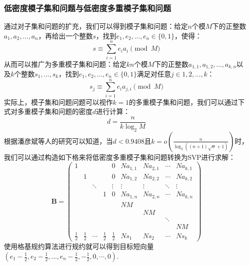 \documentclass{book}
\numberwithin{equation}{subsubsection}
\begin{document}
\subsubsection{低密度模子集和问题与低密度多重模子集和问题}
通过对子集和问题的扩充，我们可以得到模子集和问题：给定$n$个模$M$下的正整数$a_1,a_2,\ldots,a_n$，再给出一个整数$s$，找到$e_1,e_2,\ldots,e_n\in\{0,1\}$，使得：
\begin{equation}
    s\equiv\sum_{i=1}^{n}e_ia_i\pmod{M}
    \nonumber
\end{equation}
从而可以推广为多重模子集和问题：给定$kn$个模$M$下的正整数$a_{1,1},a_{1,2},\ldots,a_{k,n}$以及$k$个整数$s_1,\ldots,s_k$，找到$e_1,e_2,\ldots,e_n\in\{0,1\}$满足对任意$j\in{1,2,\ldots,k}$：
\begin{equation}
    s_j\equiv\sum_{i=1}^{n}e_ia_{j,i}\pmod{M}
    \nonumber
\end{equation}
实际上，模子集和问题问题可以视作$k=1$的多重模子集和问题，我们可以通过下式对多重模子集和问题的密度$d$进行计算：
\begin{equation}
    d=\frac{n}{k\log_2M}
    \nonumber
\end{equation}
根据潘彦斌等人的研究可以知道，当$d<0.9408$且$k=o\left(\frac{n}{\log_2((n+1)\sqrt{n}+1)}\right)$时，我们可以通过构造如下格来将低密度多重模子集和问题转换为SVP进行求解：
\begin{equation}
    \pmb{B}=\left(\begin{matrix}
        1&&&&0&Na_{1,1}&Na_{2,1}&\cdots&Na_{k,1}\\
        &1&&&0&Na_{1,2}&Na_{2,2}&\cdots&Na_{k,2}\\
        &&\ddots&&\vdots&\vdots&\vdots&\ddots&\vdots\\
        &&&1&0&Na_{1,n}&Na_{2,n}&\cdots&Na_{k,n}\\
        &&&&&NM&&&\\
        &&&&&&NM&&\\
        &&&&&&&\ddots&\\
        &&&&&&&&NM\\
        \frac{1}{2}&\frac{1}{2}&\cdots&\frac{1}{2}&\frac{1}{2}&Ns_1&Ns_2&\cdots&Ns_k
    \end{matrix}\right)
    \nonumber
\end{equation}
使用格基规约算法进行规约就可以得到目标短向量$(e_1-\frac{1}{2},e_2-\frac{1}{2},\ldots,e_n-\frac{1}{2},-\frac{1}{2},0,\cdots,0)$.
\end{document}
